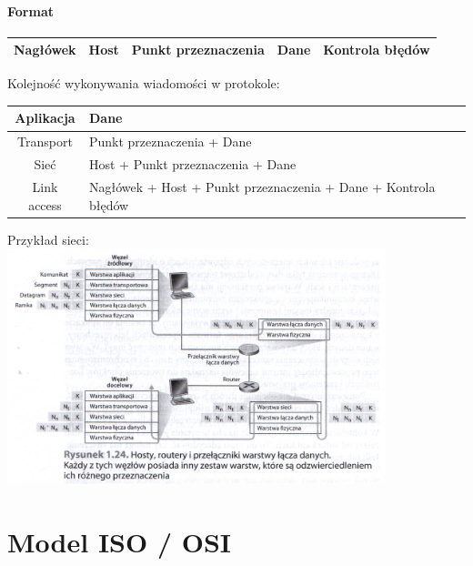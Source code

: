 		\subsection{Format}
		\begin{table}[h]
			\begin{tabular}{|c|c|c|c|c|}
				\hline
				Nagłówek & Host & Punkt przeznaczenia & Dane & Kontrola błędów \\ \hline
			\end{tabular}
		\end{table}
		Kolejność wykonywania wiadomości w protokole:
		\begin{table}[h]
			\begin{tabular}{|c|l|}
				\hline
				Aplikacja	& Dane								\\ \hline
				Transport	& Punkt przeznaczenia + Dane		\\ \hline
				Sieć		& Host + Punkt przeznaczenia + Dane	\\ \hline
				Link access & Nagłówek + Host + Punkt przeznaczenia + Dane + Kontrola błędów \\ \hline
			\end{tabular}
		\end{table}
		Przykład sieci:\\
		\includegraphics[width=11cm]{./images/image01.jpg}

\part{Model ISO / OSI}
